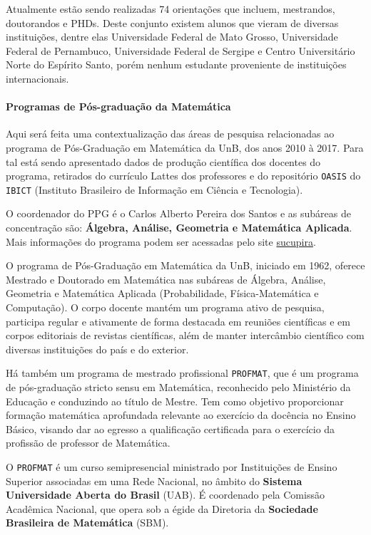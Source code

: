 \documentclass[]{article}
\let\oldparagraph\paragraph
\renewcommand{\paragraph}[1]{\oldparagraph{#1}\mbox{}}
\begin{document}
Atualmente estão sendo realizadas 74 orientações que incluem,
mestrandos, doutorandos e PHDs. Deste conjunto existem alunos que vieram
de diversas instituições, dentre elas Universidade Federal de Mato
Grosso, Universidade Federal de Pernambuco, Universidade Federal de
Sergipe e Centro Universitário Norte do Espírito Santo, porém nenhum
estudante proveniente de instituições internacionais.

\paragraph{Programas de Pós-graduação da
Matemática}\label{programas-de-pos-graduacao-da-matematica}

Aqui será feita uma contextualização das áreas de pesquisa relacionadas
ao programa de Pós-Graduação em Matemática da UnB, dos anos 2010 à 2017.
Para tal está sendo apresentado dados de produção científica dos
docentes do programa, retirados do currículo Lattes dos professores e do
repositório \texttt{OASIS} do \texttt{IBICT} (Instituto Brasileiro de
Informação em Ciência e Tecnologia).

O coordenador do PPG é o Carlos Alberto Pereira dos Santos e as subáreas
de concentração são: \textbf{Álgebra, Análise, Geometria e Matemática
Aplicada}. Mais informações do programa podem ser acessadas pelo site
\href{https://sucupira.capes.gov.br/sucupira/public/consultas/coleta/programa/viewPrograma.jsf?popup=true\&cd_programa=53001010003P2}{sucupira}.

O programa de Pós-Graduação em Matemática da UnB, iniciado em 1962,
oferece Mestrado e Doutorado em Matemática nas subáreas de Álgebra,
Análise, Geometria e Matemática Aplicada (Probabilidade,
Física-Matemática e Computação). O corpo docente mantém um programa
ativo de pesquisa, participa regular e ativamente de forma destacada em
reuniões científicas e em corpos editoriais de revistas científicas,
além de manter intercâmbio científico com diversas instituições do país
e do exterior.

Há também um programa de mestrado profissional \texttt{PROFMAT}, que é
um programa de pós-graduação stricto sensu em Matemática, reconhecido
pelo Ministério da Educação e conduzindo ao título de Mestre. Tem como
objetivo proporcionar formação matemática aprofundada relevante ao
exercício da docência no Ensino Básico, visando dar ao egresso a
qualificação certificada para o exercício da profissão de professor de
Matemática.

O \texttt{PROFMAT} é um curso semipresencial ministrado por Instituições
de Ensino Superior associadas em uma Rede Nacional, no âmbito do
\textbf{Sistema Universidade Aberta do Brasil} (UAB). É coordenado pela
Comissão Acadêmica Nacional, que opera sob a égide da Diretoria da
\textbf{Sociedade Brasileira de Matemática} (SBM).
\end{document}
